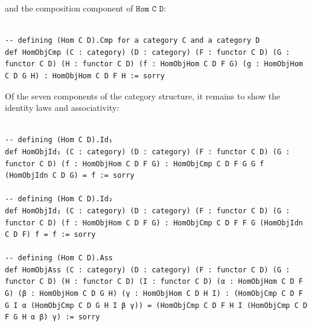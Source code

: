\documentclass{book}
\newcounter{lcounter}
\begin{document}
and the composition component of $\texttt{Hom C D}$:

\begin{center}
\begin{tcolorbox}[width=5in,colback={white},title={\begin{center}\texttt{Lean \thelcounter} \addtocounter{lcounter}{1}  \end{center}},colbacktitle=Blue,coltitle=black]
\begin{verbatim}

-- defining (Hom C D).Cmp for a category C and a category D
def HomObjCmp (C : category) (D : category) (F : functor C D) (G : functor C D) (H : functor C D) (f : HomObjHom C D F G) (g : HomObjHom C D G H) : HomObjHom C D F H := sorry

\end{verbatim}%
\end{tcolorbox}
\end{center}

Of the seven components of the category structure, it remains to show the identity laws and associativity:\\

\begin{center}
\begin{tcolorbox}[width=5in,colback={white},title={\begin{center}\texttt{Lean \thelcounter} \addtocounter{lcounter}{1}  \end{center}},colbacktitle=Blue,coltitle=black]
\begin{verbatim}

-- defining (Hom C D).Id₁
def HomObjId₁ (C : category) (D : category) (F : functor C D) (G : functor C D) (f : HomObjHom C D F G) : HomObjCmp C D F G G f (HomObjIdn C D G) = f := sorry

-- defining (Hom C D).Id₂
def HomObjId₂ (C : category) (D : category) (F : functor C D) (G : functor C D) (f : HomObjHom C D F G) : HomObjCmp C D F F G (HomObjIdn C D F) f = f := sorry

-- defining (Hom C D).Ass
def HomObjAss (C : category) (D : category) (F : functor C D) (G : functor C D) (H : functor C D) (I : functor C D) (α : HomObjHom C D F G) (β : HomObjHom C D G H) (γ : HomObjHom C D H I) : (HomObjCmp C D F G I α (HomObjCmp C D G H I β γ)) = (HomObjCmp C D F H I (HomObjCmp C D F G H α β) γ) := sorry

\end{verbatim}%
\end{tcolorbox}
\end{center}
\end{document}
